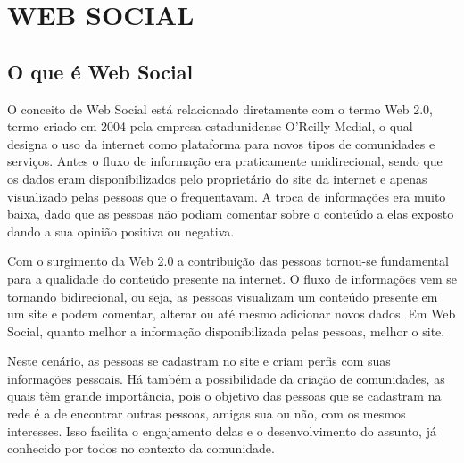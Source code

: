 \chapter{WEB SOCIAL} %
\label{cha:web_social}

\section{O que é Web Social}

O conceito de Web Social está relacionado diretamente com o termo Web 2.0, termo criado em 2004 pela empresa estadunidense O'Reilly Medial, o qual designa o uso da internet como plataforma para novos tipos de comunidades e serviços. Antes o fluxo de informação era praticamente unidirecional, sendo que os dados eram disponibilizados pelo proprietário do site da internet e apenas visualizado pelas pessoas que o frequentavam. A troca de informações era muito baixa, dado que as pessoas não podiam comentar sobre o conteúdo a elas exposto dando a sua opinião positiva ou negativa.

Com o surgimento da Web 2.0 a contribuição das pessoas tornou-se fundamental para a qualidade do conteúdo presente na internet. O fluxo de informações vem se tornando bidirecional, ou seja, as pessoas visualizam um conteúdo presente em um site e podem comentar, alterar ou até mesmo adicionar novos dados. Em Web Social, quanto melhor a informação disponibilizada pelas pessoas, melhor o site.

Neste cenário, as pessoas se cadastram no site e criam perfis com suas informações pessoais. Há também a possibilidade da criação de comunidades, as quais têm grande importância, pois o objetivo das pessoas que se cadastram na rede é a de encontrar outras pessoas, amigas sua ou não, com os mesmos interesses. Isso facilita o engajamento delas e o desenvolvimento do assunto, já conhecido por todos no contexto da comunidade.






